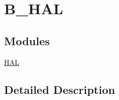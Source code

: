\hypertarget{group___b___h_a_l}{}\section{B\+\_\+\+H\+AL}
\label{group___b___h_a_l}
\subsection*{Modules}
\begin{DoxyCompactItemize}
\item 
\mbox{\hyperlink{group___h_a_l}{H\+AL}}
\end{DoxyCompactItemize}


\subsection{Detailed Description}
